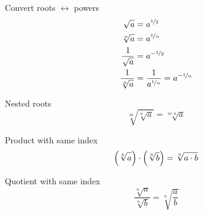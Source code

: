 \begin{multicols}{2}

 \begin{FormulaBox}{Convert roots $\longleftrightarrow$ powers}
  \begin{equation*}
   \begin{split}
     \sqrt{a} &= a^{\nicefrac{1}{2}}
     \\
     \sqrt[n]{a} &= a^{\nicefrac{1}{n}}
     \\
     \frac{1}{\sqrt{a}} &= a^{-\nicefrac{1}{2}}
     \\
     \frac{1}{\sqrt[n]{a}} &= \frac{1}{a^{\nicefrac{1}{n}}} = a^{-\nicefrac{1}{n}}
     \\
   \end{split}
  \end{equation*}
 \end{FormulaBox}

 \begin{FormulaBox}{Nested roots}
  \begin{equation*}
   \sqrt[m]{\sqrt[n]{a}} = \sqrt[m\cdot n]{a}
  \end{equation*}
 \end{FormulaBox}

 \begin{FormulaBox}{Product with same index}
  \begin{equation*}
   \left(\sqrt[n]{\vphantom{b}a}\right)
   \cdot
   \left(\sqrt[n]{b}\right) = \sqrt[n]{a \cdot b}
  \end{equation*}
 \end{FormulaBox}

 \begin{FormulaBox}{Quotient with same index}
  \begin{equation*}
   \frac{\sqrt[n]{a}}{\sqrt[n]{b}}
   =
   \sqrt[n]{\frac{a}{b}}
  \end{equation*}
 \end{FormulaBox}

\end{multicols}

